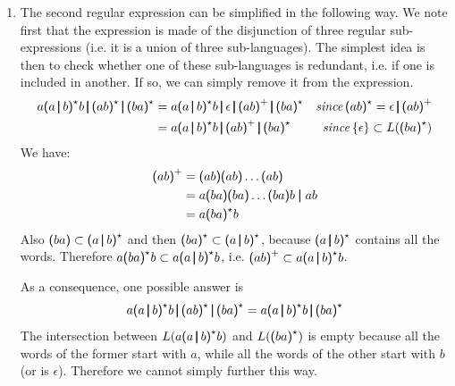 \begin{enumerate}
  \item The second regular expression can be simplified in the
    following way. We note first that the expression is made of the
    disjunction of three regular sub-expressions (i.e. it is a union
    of three sub-languages). The simplest idea is then to check
    whether one of these sub-languages is redundant, i.e. if one is
    included in another. If so, we can simply remove it from the
    expression.
    \begin{align*}
      a \textsf{(} a \, \pmb{\lvert}{} \, b \textsf{)}^{\star}{} b
      \, \pmb{\lvert}{} \, \textsf{(} a b \textsf{)}^{\star}{}
      \, \pmb{\lvert}{} \, \textsf{(} b a \textsf{)}^{\star}
      &= a \textsf{(} a \, \pmb{\lvert}{} \, b \textsf{)}^{\star}{} b
      \, \pmb{\lvert}{} \, \epsilon
      \, \pmb{\lvert}{} \, \textsf{(} a b \textsf{)}^{+}{}
      \, \pmb{\lvert}{} \, \textsf{(} b a \textsf{)}^{\star}
      & \text{\emph{since}} \, \textsf{(} ab \textsf{)}^{\star} =
      \epsilon \, \pmb{\lvert}{}\, \textsf{(} ab \textsf{)}^{+}\\
      &= a \textsf{(} a \, \pmb{\lvert}{} \, b \textsf{)}^{\star}{} b
      \, \pmb{\lvert}{} \, \textsf{(} a b \textsf{)}^{+}{}
      \, \pmb{\lvert}{} \, \textsf{(} b a \textsf{)}^{\star}
      & \text{\emph{since}} \, \{\epsilon\} \subset L(\textsf{(} ba
      \textsf{)}^{\star})
    \end{align*}
    We have:
    \begin{align*}
      \textsf{(} ab\textsf{)}^{+}
      &= \textsf{(} ab\textsf{)} \textsf{(} ab\textsf{)} \ldots \textsf{(} ab \textsf{)}\\
      &= a\textsf{(} ba\textsf{)}\textsf{(} ba\textsf{)}\ldots\textsf{(}  ba\textsf{)} b \;
      \pmb{\lvert}{} \; ab\\
      &= a\textsf{(} ba \textsf{)}^{\star} b
    \end{align*}
    Also \(\textsf{(} ba \textsf{)} \subset \textsf{(} a \, \pmb{\lvert}{} \,
    b\textsf{)}^{\star}\) and then \(\textsf{(} ba \textsf{)}^{\star}
    \subset \textsf{(} a \, \pmb{\lvert}{} \, b\textsf{)}^{\star}\), because
    \(\textsf{(} a \, \pmb{\lvert}{} \, b\textsf{)}^{\star}\) contains all
     the words. Therefore \(a \textsf{(} ba \textsf{)}^{\star} b \subset a
   \textsf{(} a \, \pmb{\lvert}{} \, b\textsf{)}^{\star} b\), i.e. \(\textsf{(}
   ab\textsf{)}^{+} \subset a \textsf{(} a \, \pmb{\lvert}{} \, b\textsf{)}^{\star}
   b\).

   As a consequence, one possible answer is
   \[
     a \textsf{(} a \, \pmb{\lvert}{} \, b \textsf{)}^{\star}{} b
     \, \pmb{\lvert}{} \, \textsf{(} a b \textsf{)}^{\star}{}
     \, \pmb{\lvert}{} \, \textsf{(} b a \textsf{)}^{\star}
     = a \textsf{(} a \, \pmb{\lvert}{} \, b\textsf{)}^{\star} b
     \, \pmb{\lvert}{} \, \textsf{(} ba \textsf{)}^{\star}
   \]
   The intersection between \(L(a \textsf{(} a \, \pmb{\lvert}{} \,
   b\textsf{)}^{\star} b)\) and \(L(\textsf{(} ba \textsf{)}^{\star})\) is
   empty because all the words of the former start with \(a\), while
   all the words of the other start with \(b\) (or is \(\epsilon\)).
   Therefore we cannot simply further this way.

\end{enumerate}

